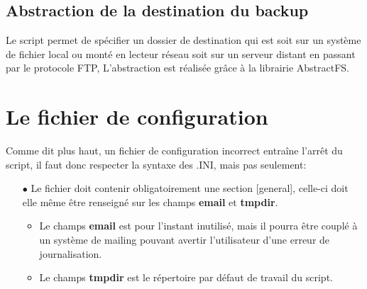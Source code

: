 \subsection*{Abstraction de la destination du backup}

Le script permet de spécifier un dossier de destination qui est soit sur un système de fichier local ou monté en lecteur réseau soit sur un serveur distant en passant par le protocole FTP,
L'abstraction est réalisée grâce à la librairie AbstractFS.

\newpage

\section*{Le fichier de configuration}

Comme dit plus haut, un fichier de configuration incorrect entraîne l'arrêt du script, il faut donc respecter la syntaxe des .INI, mais pas seulement:

\begin{itemize}
\item[$\bullet$] Le fichier doit contenir obligatoirement une section [general], celle-ci doit elle même être renseigné sur les champs \textbf{email} et \textbf{tmpdir}. 
\begin{itemize}
\item Le champs \textbf{email} est pour l'instant inutilisé, mais il pourra être couplé à un système de mailing pouvant avertir l'utilisateur d'une erreur de journalisation.
\item Le champs \textbf{tmpdir} est le répertoire par défaut de travail du script. 
\end{itemize}
\end{itemize}

